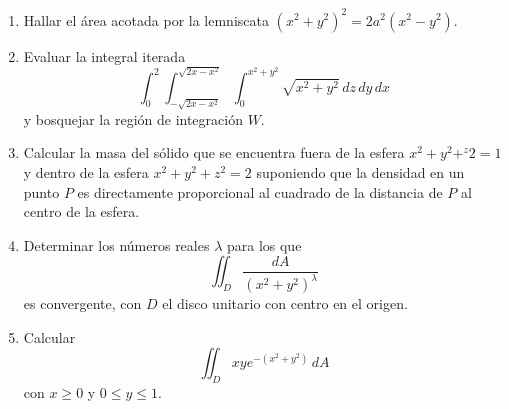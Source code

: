 \documentclass{article}
\begin{document}
\begin{enumerate}
        \item {
            Hallar el área acotada por la lemniscata
            \(
                \left(x^2+y^2\right)^2=2a^2\left(x^2-y^2\right)
            \).

            \color{azul}
        }

        \item {
            Evaluar la integral iterada
            \[
                \int_{0}^{2}{
                    \int_{-\sqrt{2x-x^2}}^{\sqrt{2x-x^2}}{
                        \int_{0}^{x^2+y^2}{
                            \sqrt{x^2+y^2}
                        \,dz}
                    \,dy}
                \,dx}
            \]
            y bosquejar la región de integración $W$.

            \color{azul}
        }

        \item {
            Calcular la masa del sólido que se encuentra fuera de la esfera
            $x^2+y^2+^z2=1$ y dentro de la esfera $x^2+y^2+z^2=2$ suponiendo
            que la densidad en un punto $P$ es directamente proporcional al
            cuadrado de la distancia de $P$ al centro de la esfera.

            \color{azul}
        }

        \item {
            Determinar los números reales $\lambda$ para los que
            \[
                \iint_D {\frac{dA}{\left(x^2+y^2\right)^\lambda}}
            \]
            es convergente, con $D$ el disco unitario con centro en el origen.

            \color{azul}
        }

        \item {
            Calcular
            \[
                \iint_D {xye^{-\left(x^2+y^2\right)}\,dA}
            \]
            con $x\geq 0$ y $0\leq y\leq 1$.

            \color{azul}
        }
    \end{enumerate}
\end{document}

